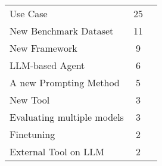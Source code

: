 \begin{table}[ht]
\begin{tabular}{l c p{4cm}}
		Use Case & 25 \\
		New Benchmark Dataset & 11 \\
		New Framework & 9 \\
		LLM-based Agent & 6 \\
		A new Prompting Method & 5 \\
		New Tool & 3 \\
		Evaluating multiple models & 3 \\
		Finetuning & 2 \\
		External Tool on LLM & 2 \\
	\bottomrule
    \end{tabular}
    \label{tab:methodologies}
\end{table}